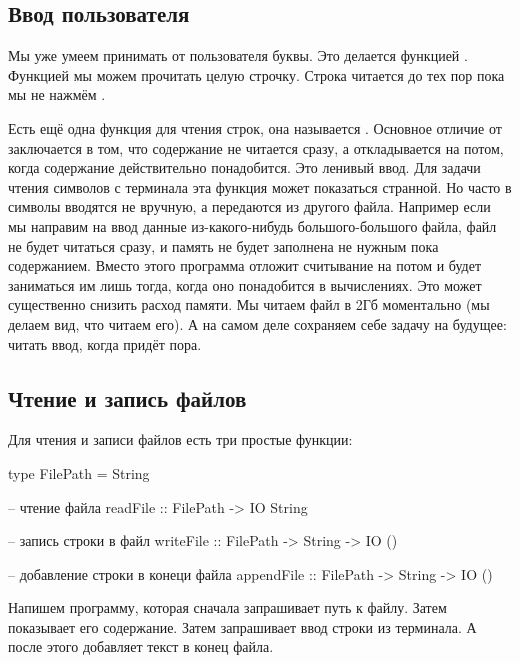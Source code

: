\subsection{Ввод пользователя}

Мы уже умеем принимать от пользователя буквы. Это делается функцией
. Функцией  мы можем прочитать целую строчку.
Строка читается до тех пор пока мы не нажмём .



Есть ещё одна функция для чтения строк, она называется .
Основное отличие от  заключается в том, что содержание не
читается сразу, а откладывается на потом, когда содержание действительно
понадобится. Это ленивый ввод. Для задачи чтения символов с терминала
эта функция может показаться странной. Но часто в символы вводятся не
вручную, а передаются из другого файла. Например если мы направим на
ввод данные из-какого-нибудь большого-большого файла, файл не будет
читаться сразу, и память не будет заполнена не нужным пока содержанием.
Вместо этого программа отложит считывание на потом и будет заниматься им
лишь тогда, когда оно понадобится в вычислениях. Это может существенно
снизить расход памяти. Мы читаем файл в 2Гб моментально (мы делаем вид,
что читаем его). А на самом деле сохраняем себе задачу на будущее:
читать ввод, когда придёт пора.

\subsection{Чтение и запись файлов}

Для чтения и записи файлов есть три простые функции:


\begin{code}
type FilePath = String

-- чтение файла
readFile    :: FilePath -> IO String

-- запись строки в файл
writeFile   :: FilePath -> String -> IO ()

-- добавление строки в конеци файла
appendFile  :: FilePath -> String -> IO ()
\end{code}

Напишем программу, которая сначала запрашивает путь к файлу. Затем
показывает его содержание. Затем запрашивает ввод строки из терминала. А
после этого добавляет текст в конец файла.


